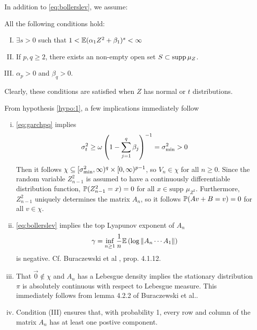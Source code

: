 In addition to \eqref{eq:bollerslev}, we assume:
\begin{hypothesis}
  All the following conditions hold:
  \label{hypo:1}
  \begin{enumerate}[(I)]
  \item $\exists s > 0$ such that
    $1 < \E (\alpha_1 Z^2 + \beta_1)^s < \infty$
  \item If $p, q \geq 2$, there exists an non-empty open set
    $S \subset \supp \mu_Z$.
  \item $\alpha_p > 0$  and $\beta_q > 0$.
  \end{enumerate}
\end{hypothesis}
Clearly, these conditions are satisfied when $Z$ has normal or $t$
distributions.
\begin{remark}
  \label{remark:fhrtgh}
  From hypothesis \ref{hypo:1}, a few implications immediately follow
  \begin{enumerate}[(i)]
  \item \eqref{eq:garchpq} implies
    \[
    \sigma_t^2 \geq \omega \left(
      1 - \sum_{j=1}^q \beta_j
    \right)^{-1} = \sigma_{\m}^2 > 0
    \]
    Then it follows
    $\chi \subseteq [\sigma_{\m}^2, \infty)^q \times [0, \infty)^{p-1}$, so
    $V_n \in \chi$ for all $n \geq 0$. Since the random variable
    $Z_{n-1}^2$ is assumed to have a continuously differentiable
    distribution function,
    $\P(Z_{n-1}^2 = x) = 0$ for all $x \in \text{supp } \mu_{Z^2}$.
    Furthermore, $Z_{n-1}^2$ uniquely determines the matrix $A_n$,
    so it follows $\P(A v + B = v) = 0$ for all $v \in \chi$.
  \item \eqref{eq:bollerslev} implies the top Lyapunov exponent of $A_n$
    \begin{equation}
      \label{eq:Lyapunov}
      \gamma = \inf_{n \geq 1} {1 \over n}
      \E \left(\log \| A_n \cdots A_1 \| \right)    
    \end{equation}
    is negative. Cf. Buraczewski et al
    \cite{buraczewski:damek:mikosch:2016}, prop. 4.1.12.

  \item That $\vec 0 \notin \chi$ and $A_n$ has a Lebesgue density
    implies the stationary distribution $\pi$ is absolutely continuous with
    respect to Lebesgue measure. This immediately follows from lemma
    4.2.2 of Buraczewski et al.\cite{buraczewski:damek:mikosch:2016}.

  \item Condition (III) ensures that, with probability 1, every row and
    column of the matrix $A_n$ has at least one postive component.
  \end{enumerate}
\end{remark}
